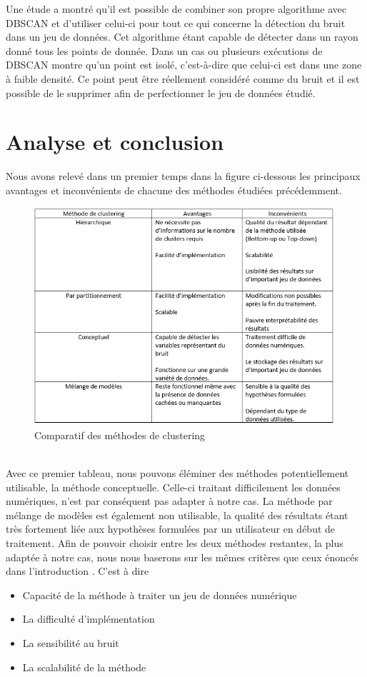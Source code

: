 \documentclass[memoire.tex]{subfiles}
\begin{document}
Une étude a montré qu’il est possible de combiner son propre algorithme avec DBSCAN et d’utiliser celui-ci pour tout ce qui concerne la détection du bruit dans un jeu de données. Cet algorithme étant capable de détecter dans un rayon donné tous les points de donnée. Dans un cas ou plusieurs exécutions de DBSCAN montre qu’un point est isolé, c’est-à-dire que celui-ci est dans une zone à faible densité. Ce point peut être réellement considéré comme du bruit et il est possible de le supprimer afin de perfectionner le jeu de données étudié.\cite{ref17}

\section{Analyse et conclusion}

Nous avons relevé dans un premier temps dans la figure ci-dessous les principaux avantages et inconvénients de chacune des méthodes étudiées précédemment.
	\begin{figure}[h!]
		\centerline{\includegraphics[scale=0.7]{img/comparatif_methodes.png}}
		\caption{Comparatif des méthodes de clustering}
	\end{figure}\\
Avec ce premier tableau, nous pouvons éléminer des méthodes potentiellement utilisable, la méthode conceptuelle. Celle-ci traitant difficilement les données numériques, n'est par conséquent pas adapter à notre cas. La méthode par mélange de modèles est également non utilisable, la qualité des résultats étant très fortement liée aux hypothèses formulées par un utilisateur en début de traitement.
Afin de pouvoir choisir entre les deux méthodes restantes, la plus adaptée à notre cas, nous nous baserons sur les mêmes critères que ceux énoncés dans l'introduction . C'est à dire \begin{itemize}
\item Capacité de la méthode à traiter un jeu de données numérique
\item La difficulté d'implémentation
\item La sensibilité au bruit
\item La scalabilité de la méthode
\end{itemize}
\end{document}
